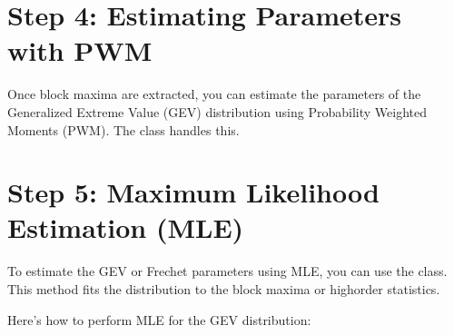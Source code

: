 \documentclass[a4paper,11pt,openany,english]{sphinxmanual}
\begin{document}
\section{Step 4: Estimating Parameters with PWM}
\label{\detokenize{topt:step-4-estimating-parameters-with-pwm}}
\sphinxAtStartPar
Once block maxima are extracted, you can estimate the parameters of the Generalized Extreme Value (GEV) distribution using Probability Weighted Moments (PWM). The  class handles this.

\begin{sphinxVerbatim}[commandchars=\\\{\}]
   

  


\end{sphinxVerbatim}


\section{Step 5: Maximum Likelihood Estimation (MLE)}
\label{\detokenize{topt:step-5-maximum-likelihood-estimation-mle}}
\sphinxAtStartPar
To estimate the GEV or Frechet parameters using MLE, you can use the  class. This method fits the distribution to the block maxima or high\sphinxhyphen{}order statistics.

\sphinxAtStartPar
Here’s how to perform MLE for the GEV distribution:

\begin{sphinxVerbatim}[commandchars=\\\{\}]
   

  


\end{sphinxVerbatim}
\end{document}

